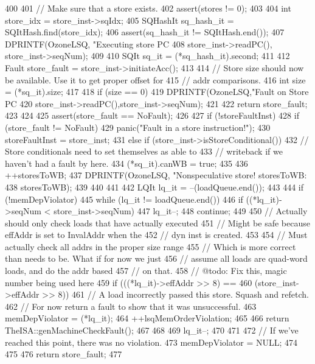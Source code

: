 \begin{DoxyCode}
400 {
401     // Make sure that a store exists.
402     assert(stores != 0);
403 
404     int store_idx = store_inst->sqIdx;
405     SQHashIt sq_hash_it = SQItHash.find(store_idx);
406     assert(sq_hash_it != SQItHash.end());
407     DPRINTF(OzoneLSQ, "Executing store PC %
408             store_inst->readPC(), store_inst->seqNum);
409 
410     SQIt sq_it = (*sq_hash_it).second;
411 
412     Fault store_fault = store_inst->initiateAcc();
413 
414     // Store size should now be available.  Use it to get proper offset for
415     // addr comparisons.
416     int size = (*sq_it).size;
417 
418     if (size == 0) {
419         DPRINTF(OzoneLSQ,"Fault on Store PC %
420                 store_inst->readPC(),store_inst->seqNum);
421 
422         return store_fault;
423     }
424 
425     assert(store_fault == NoFault);
426 
427     if (!storeFaultInst) {
428         if (store_fault != NoFault) {
429             panic("Fault in a store instruction!");
430             storeFaultInst = store_inst;
431         } else if (store_inst->isStoreConditional()) {
432             // Store conditionals need to set themselves as able to
433             // writeback if we haven't had a fault by here.
434             (*sq_it).canWB = true;
435 
436             ++storesToWB;
437             DPRINTF(OzoneLSQ, "Nonspeculative store! storesToWB:%
438                     storesToWB);
439         }
440     }
441 
442     LQIt lq_it = --(loadQueue.end());
443 
444     if (!memDepViolator) {
445         while (lq_it != loadQueue.end()) {
446             if ((*lq_it)->seqNum < store_inst->seqNum) {
447                 lq_it--;
448                 continue;
449             }
450             // Actually should only check loads that have actually executed
451             // Might be safe because effAddr is set to InvalAddr when the
452             // dyn inst is created.
453 
454             // Must actually check all addrs in the proper size range
455             // Which is more correct than needs to be.  What if for now we just
456             // assume all loads are quad-word loads, and do the addr based
457             // on that.
458             // @todo: Fix this, magic number being used here
459             if (((*lq_it)->effAddr >> 8) ==
460                 (store_inst->effAddr >> 8)) {
461                 // A load incorrectly passed this store.  Squash and refetch.
462                 // For now return a fault to show that it was unsuccessful.
463                 memDepViolator = (*lq_it);
464                 ++lsqMemOrderViolation;
465 
466                 return TheISA::genMachineCheckFault();
467             }
468 
469             lq_it--;
470         }
471 
472         // If we've reached this point, there was no violation.
473         memDepViolator = NULL;
474     }
475 
476     return store_fault;
477 }
\end{DoxyCode}
